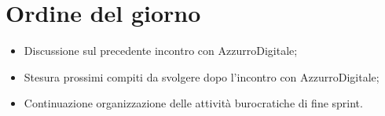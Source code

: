 

\section{Ordine del giorno}

\begin{itemize}
    \item Discussione sul precedente incontro con AzzurroDigitale;
    \item Stesura prossimi compiti da svolgere dopo l'incontro con AzzurroDigitale;
    \item Continuazione organizzazione delle attività burocratiche di fine sprint.
\end{itemize}